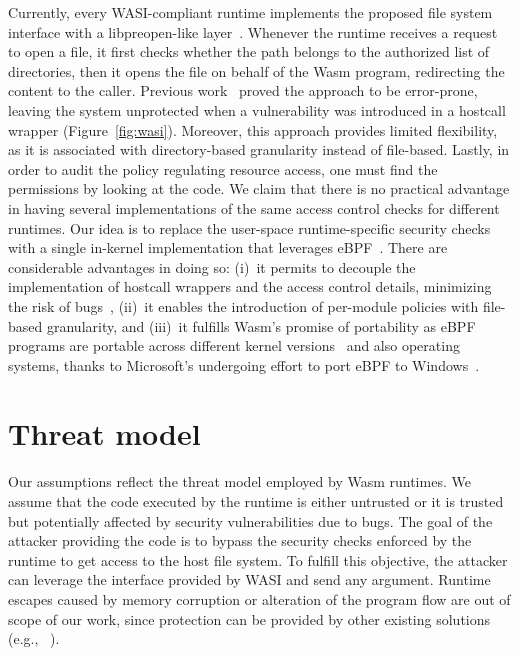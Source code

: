 Currently, every WASI-compliant runtime implements the proposed file system
interface with a libpreopen-like layer~\cite{libpreopen}. Whenever the runtime
receives a request to open a file, it first checks whether the path
belongs to the authorized list of directories, then it opens the file
on behalf of the Wasm program, redirecting the content to the caller.
Previous work~\cite{johnson2022wave,
  bosamiya2022provably, lehmann2020everything} proved the approach
to be error-prone, leaving the system unprotected when a vulnerability
was introduced in a hostcall wrapper (Figure~\ref{fig:wasi}). Moreover,
this approach provides limited flexibility, as it is associated with
directory-based granularity instead of file-based. Lastly, in order to audit
the policy regulating resource access, one must find the permissions
by looking at the code.
We claim that there is no practical advantage in having several
implementations of the same access control checks for different
runtimes. Our idea is to replace the user-space runtime-specific
security checks with a single in-kernel implementation that leverages
eBPF~\cite{bpf-lsm-hooks}.
There are considerable advantages in doing so: (i)~it permits to decouple the implementation of hostcall wrappers
and the access control details, minimizing the risk of bugs~\cite{kehoe2022ebpf,seapp, cage4deno},
(ii)~it enables the introduction of per-module policies with file-based
granularity, and (iii)~it fulfills Wasm's promise of portability as eBPF programs are portable across different kernel versions~\cite{andrii2021bpfCORE} and also operating systems, thanks
to Microsoft's undergoing effort to port eBPF to
Windows~\cite{ebpf-windows}.

\section{Threat model}

Our assumptions reflect the threat model employed by Wasm runtimes. We
assume that the code executed by the runtime is either untrusted or it
is trusted but potentially affected by security vulnerabilities due to
bugs. The goal of the attacker providing the code is to bypass the
security checks enforced by the runtime to get access to the host file
system. To fulfill this objective, the attacker can leverage the
interface provided by WASI and send any argument. Runtime escapes
caused by memory corruption or alteration of the program flow are out
of scope of our work, since protection can be provided by other
existing solutions (e.g., ~\cite{bosamiya2022provably}).

